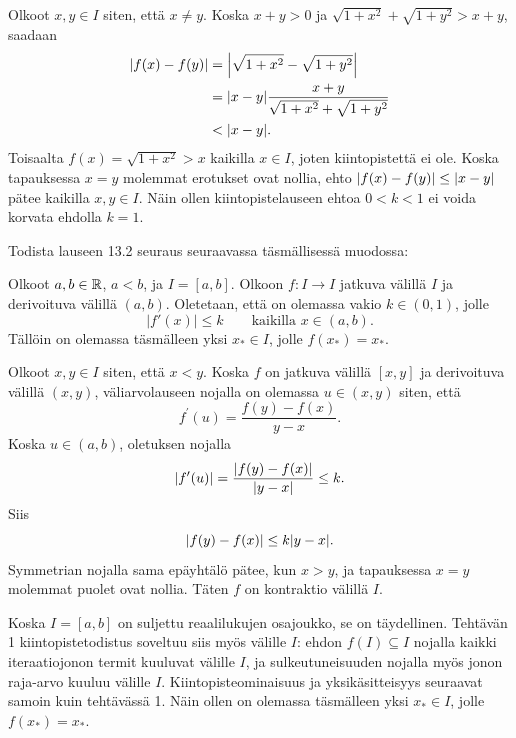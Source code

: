 \documentclass[11pt,a4paper]{amsart}
\begin{document}
\begin{solution}
  Olkoot \(x,y \in I\) siten, että \(x \neq y\). Koska \(x+y>0\) ja
  \(\sqrt{1+x^2}+\sqrt{1+y^2}>x+y\), saadaan
  \[
    \begin{aligned}
      \abs{f(x) - f(y)} &= \abs*{\sqrt{1 + x^2} - \sqrt{1 + y^2}} \\
      &= \abs{x-y}\frac{x+y}{\sqrt{1+x^2}+\sqrt{1+y^2}} \\
      &< \abs{x-y}.
    \end{aligned}
  \]
  Toisaalta \(f(x)=\sqrt{1+x^2}>x\) kaikilla \(x\in I\), joten
  kiintopistettä ei ole. Koska tapauksessa \(x=y\) molemmat erotukset
  ovat nollia, ehto \(\abs{f(x)-f(y)}\leq\abs{x-y}\) pätee kaikilla
  \(x,y\in I\). Näin ollen kiintopistelauseen ehtoa \(0<k<1\) ei voida
  korvata ehdolla \(k=1\).
\end{solution}

\begin{exercise}
  Todista lauseen 13.2 seuraus seuraavassa täsmällisessä muodossa:

  Olkoot \(a,b\in\RR\), \(a<b\), ja \(I=[a,b]\).
  Olkoon \(f\colon I\to I\) jatkuva välillä \(I\) ja derivoituva
  välillä \((a,b)\). Oletetaan, että on olemassa vakio \(k\in(0,1)\),
  jolle
  \[
    \lvert f'(x)\rvert\leq k
    \qquad\text{kaikilla }x\in(a,b).
  \]
  Tällöin on olemassa täsmälleen yksi \(x_*\in I\), jolle
  \(f(x_*)=x_*\).
\end{exercise}

\begin{solution}
  Olkoot \(x, y \in I\) siten, että \(x < y\). Koska \(f\) on jatkuva
  välillä \([x,y]\) ja derivoituva välillä \((x,y)\), väliarvolauseen
  nojalla on olemassa \(u \in (x,y)\) siten, että
  \[
    f^{\prime}(u) = \frac{f(y) - f(x)}{y - x}.
  \]
  Koska \(u \in (a,b)\), oletuksen nojalla
  \[
    \abs{f^{\prime}(u)} = \frac{\abs{f(y) - f(x)}}{\abs{y - x}} \leq k.
  \]
  Siis
  \[
    \abs{f(y) - f(x)} \leq k\abs{y - x}.
  \]
  Symmetrian nojalla sama epäyhtälö pätee, kun \(x > y\), ja tapauksessa
  \(x = y\) molemmat puolet ovat nollia. Täten \(f\) on kontraktio
  välillä \(I\).

  Koska \(I=[a,b]\) on suljettu reaalilukujen osajoukko, se on täydellinen.
  Tehtävän 1 kiintopistetodistus soveltuu siis myös välille \(I\): ehdon
  \(f(I) \subseteq I\) nojalla kaikki iteraatiojonon termit kuuluvat
  välille \(I\), ja sulkeutuneisuuden nojalla myös jonon raja-arvo kuuluu
  välille \(I\). Kiintopisteominaisuus ja yksikäsitteisyys seuraavat
  samoin kuin tehtävässä 1. Näin ollen on olemassa täsmälleen yksi
  \(x_* \in I\), jolle \(f(x_*) = x_*\).
\end{solution}
\end{document}
